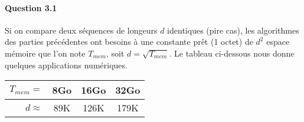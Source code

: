 \paragraph{Question 3.1}
Si on compare deux s\'equences de longeurs $d$ identiques (pire cas),
les algorithmes des parties pr\'ec\'edentes ont besoins \`a une
constante pr\^et (1 octet) de $d^2$ espace m\'emoire que l'on note
$T_{mem}$, soit $d=\sqrt{T_{mem}}$. Le tableau ci-dessous nous donne
quelques applications num\'eriques.
\begin{table*}[h]
  \centering
  \begin{tabular}{rc|c|c}
    $T_{mem}=$&8Go&16Go&32Go\\
    \hline
    $d\approx$&89K&126K&179K
  \end{tabular}
\end{table*}

